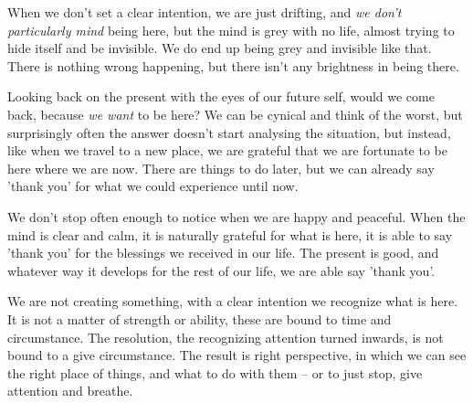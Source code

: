 When we don't set a clear intention, we are just drifting, and \emph{we
don't particularly mind} being here, but the mind is grey with no life,
almost trying to hide itself and be invisible. We do end up being grey
and invisible like that. There is nothing wrong happening, but there
isn't any brightness in being there.

Looking back on the present with the eyes of our future self, would we
come back, because \emph{we want} to be here? We can be cynical and
think of the worst, but surprisingly often the answer doesn't start
analysing the situation, but instead, like when we travel to a new
place, we are grateful that we are fortunate to be here where we are
now. There are things to do later, but we can already say 'thank you'
for what we could experience until now.

We don't stop often enough to notice when we are happy and peaceful.
When the mind is clear and calm, it is naturally grateful for what is
here, it is able to say 'thank you' for the blessings we received in our
life. The present is good, and whatever way it develops for the rest of
our life, we are able say 'thank you'.

We are not creating something, with a clear intention we recognize what
is here. It is not a matter of strength or ability, these are bound to
time and circumstance. The resolution, the recognizing attention turned
inwards, is not bound to a give circumstance. The result is right
perspective, in which we can see the right place of things, and what to
do with them -- or to just stop, give attention and breathe.

